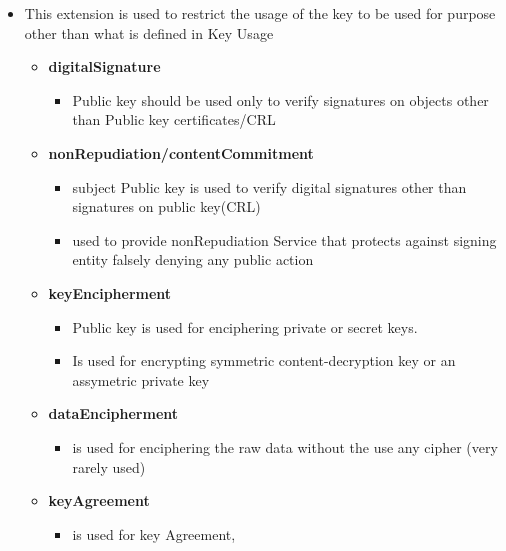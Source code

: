 \documentclass[a4paper]{article}
\begin{document}
\begin{itemize}
\begin{itemize}
                    \item This extension is used to restrict the usage of the key to be used for purpose 
                        other than what is defined in Key Usage
                    \begin{itemize}
                        \item \textbf{digitalSignature}
                            \begin{itemize}
                                \item Public key should be used only to verify signatures on objects other than Public key certificates/CRL
                            \end{itemize}
                        \item \textbf{nonRepudiation/contentCommitment}
                            \begin{itemize}
                                \item subject Public key is used to verify digital signatures other than signatures on public key(CRL)
                                \item used to provide nonRepudiation Service that protects against signing entity falsely denying any public action
                            \end{itemize}
                        \item \textbf{keyEncipherment}
                            \begin{itemize}
                                \item Public key is used for enciphering private or secret keys.
                                \item Is used for encrypting symmetric content-decryption key or an assymetric private key
                            \end{itemize}
                        \item \textbf{dataEncipherment}
                            \begin{itemize}
                                \item is used for enciphering the raw data without the use any cipher  (very rarely used)
                            \end{itemize}
                        \item \textbf{keyAgreement}
                            \begin{itemize}
                                \item is used for key Agreement, 

\end{itemize}
\end{itemize}
\end{itemize}
\end{itemize}
\end{document}

